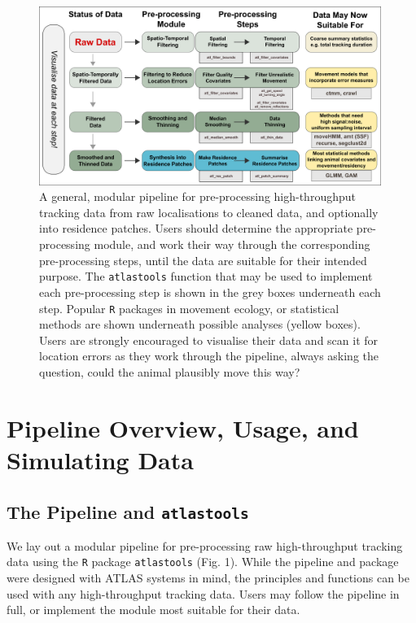 \documentclass[10pt,paper=a4,headings=standardclasses
]{scrartcl}
\begin{document}
\begin{figure}
    \centering
    \includegraphics[width=0.99\textwidth]{figures/fig_01_recipe.png}
    \caption{A general, modular pipeline for pre-processing high-throughput tracking data from raw localisations to cleaned data, and optionally into residence patches. 
    Users should determine the appropriate pre-processing module, and work their way through the corresponding pre-processing steps, until the data are suitable for their intended purpose.
    The \texttt{atlastools} function that may be used to implement each pre-processing step is shown in the grey boxes underneath each step.
    Popular \texttt{R} packages in movement ecology, or statistical methods are shown underneath possible analyses (yellow boxes).
    Users are strongly encouraged to visualise their data and scan it for location errors as they work through the pipeline, always asking the question, could the animal plausibly move this way?
    }
    \label{fig:figure_pipeline}
\end{figure}

\section{Pipeline Overview, Usage, and Simulating Data}

\subsection{The Pipeline and \texttt{atlastools}}

We lay out a modular pipeline for pre-processing raw high-throughput tracking data using the \texttt{R} package \texttt{atlastools} (Fig. 1).
While the pipeline and package were designed with ATLAS systems in mind, the principles and functions can be used with any high-throughput tracking data.
Users may follow the pipeline in full, or implement the module most suitable for their data.
\end{document}
